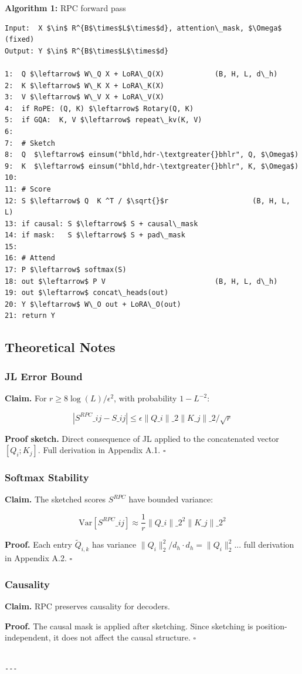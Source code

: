 \textbf{Algorithm 1:} RPC forward pass
\begin{lstlisting}
Input:  X $\in$ R^{B$\times$L$\times$d}, attention\_mask, $\Omega$ (fixed)
Output: Y $\in$ R^{B$\times$L$\times$d}

1:  Q $\leftarrow$ W\_Q X + LoRA\_Q(X)            (B, H, L, d\_h)
2:  K $\leftarrow$ W\_K X + LoRA\_K(X)
3:  V $\leftarrow$ W\_V X + LoRA\_V(X)
4:  if RoPE: (Q, K) $\leftarrow$ Rotary(Q, K)
5:  if GQA:  K, V $\leftarrow$ repeat\_kv(K, V)
6:
7:  # Sketch
8:  Q  $\leftarrow$ einsum("bhld,hdr-\textgreater{}bhlr", Q, $\Omega$)
9:  K  $\leftarrow$ einsum("bhld,hdr-\textgreater{}bhlr", K, $\Omega$)
10:
11: # Score
12: S $\leftarrow$ Q  K ^T / $\sqrt{}$r                    (B, H, L, L)
13: if causal: S $\leftarrow$ S + causal\_mask
14: if mask:   S $\leftarrow$ S + pad\_mask
15:
16: # Attend
17: P $\leftarrow$ softmax(S)
18: out $\leftarrow$ P V                          (B, H, L, d\_h)
19: out $\leftarrow$ concat\_heads(out)
20: Y $\leftarrow$ W\_O out + LoRA\_O(out)
21: return Y
\end{lstlisting}

\subsection{Theoretical Notes}

\subsubsection{JL Error Bound}

\textbf{Claim.} For $r \geq 8 \log(L) / \epsilon^2$, with probability $1 - L^{-2}$:

\[
|S^{RPC}\_{ij} - S\_{ij}| \leq \epsilon \|Q\_i\|\_2 \|K\_j\|\_2 / \sqrt{r}
\tag{4.7}
\]

\textbf{Proof sketch.} Direct consequence of JL applied to the concatenated 
vector $[Q_i; K_j]$. Full derivation in Appendix A.1. $\square$

\subsubsection{Softmax Stability}

\textbf{Claim.} The sketched scores $S^{RPC}$ have bounded variance:

\[
\text{Var}[S^{RPC}\_{ij}] \approx \frac{1}{r} \|Q\_i\|\_2^2 \|K\_j\|\_2^2
\tag{4.8}
\]

\textbf{Proof.} Each entry $\tilde{Q}_{i,k}$ has variance $\|Q_i\|_2^2 / d_h \cdot d_h = \|Q_i\|_2^2$... 
full derivation in Appendix A.2. $\square$

\subsubsection{Causality}

\textbf{Claim.} RPC preserves causality for decoders.

\textbf{Proof.} The causal mask is applied after sketching. Since sketching is 
position-independent, it does not affect the causal structure. $\square$
\begin{lstlisting}

---
\end{lstlisting}